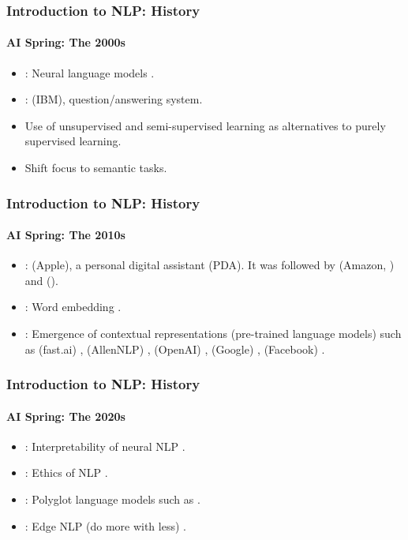 \documentclass[xcolor=table]{beamer}
\begin{document}
\begin{frame}
\frametitle{Introduction to NLP: History}
\framesubtitle{AI Spring: The 2000s}

\begin{itemize}
	\item {}: Neural language models \cite{2003-bengio-al}.
	\item {}:  (IBM), question/answering system.
	\item Use of unsupervised and semi-supervised learning as alternatives to purely supervised learning.
	\item Shift focus to semantic tasks.
\end{itemize}

\end{frame}

\begin{frame}
\frametitle{Introduction to NLP: History}
\framesubtitle{AI Spring: The 2010s}

\begin{itemize}
	\item {}:  (Apple),  a personal digital assistant (PDA). 
	It was followed by  (Amazon, ) and  ().
	\item {}: Word embedding \cite{2014-lebret-collobert}.
	\item {}: Emergence of contextual representations (pre-trained language models) such as  (fast.ai) \cite{2018-howard-ruder},  (AllenNLP) \cite{2018-peters-al},  (OpenAI) \cite{2018-radford-al},  (Google) \cite{2018-devlin-al},  (Facebook) \cite{2019-lample-conneau}.
\end{itemize}

\end{frame}

\begin{frame}
	\frametitle{Introduction to NLP: History}
	\framesubtitle{AI Spring: The 2020s}
	
	\begin{itemize}
		\item {}: Interpretability of neural NLP \cite{2020-belinkov-al,2020-kim-al,2020-jacovi-goldberg}.
		\item {}: Ethics of NLP \cite{2021-garridoMunoz-al,2021-field-al}.
		\item {}: Polyglot language models such as  \cite{2022-fu-al}.
		\item {}: Edge NLP (do more with less) \cite{2022-guo-al}.
	\end{itemize}
	
\end{frame}
\end{document}
